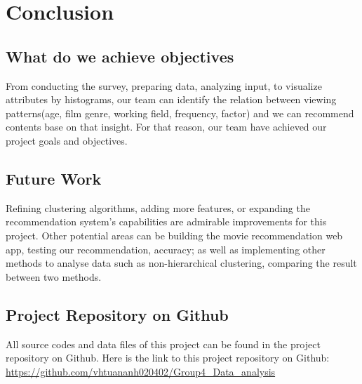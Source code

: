 \section{Conclusion}

    \subsection{What do we achieve objectives}
    From conducting the survey, preparing data, analyzing input, to visualize attributes by histograms, our team can identify the relation between viewing patterns(age, film genre, working field, frequency, factor) and we can recommend contents base on that insight. For that reason, our team have achieved our project goals and objectives.
    
    \subsection{Future Work}
    Refining clustering algorithms, adding more features, or expanding the recommendation system's capabilities are admirable improvements for this project. Other potential areas can be building the movie recommendation web app, testing our recommendation, accuracy; as well as implementing other methods to analyse data such as non-hierarchical clustering, comparing the result between two methods. 

    \subsection{Project Repository on Github}
    All source codes and data files of this project can be found in the project repository on Github. Here is the link to this project repository on Github: \url{https://github.com/vhtuananh020402/Group4_Data_analysis}


    